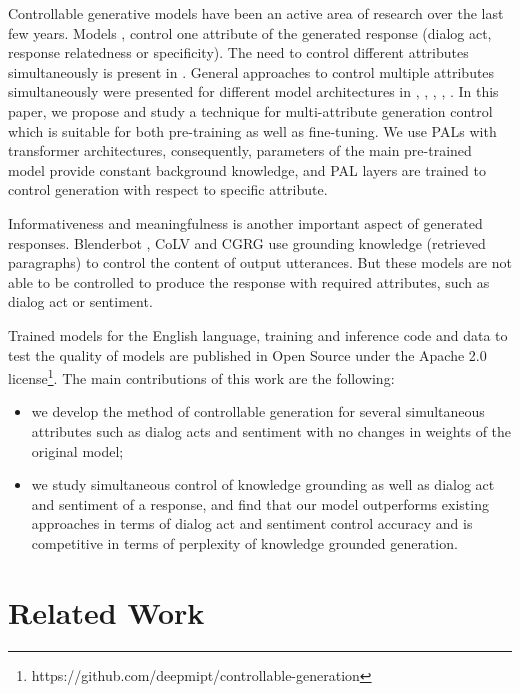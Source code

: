 \documentclass[11pt]{article}
\begin{document}
Controllable generative models have been an active area of research over the last few years. Models \cite{zhao2017learning}, \cite{zhang2018learning} control one attribute of the generated response (dialog act, response relatedness or specificity). The need to control different attributes simultaneously is present in \cite{see2019makes}. General approaches to control multiple attributes simultaneously were presented for different model architectures in \cite{hu2021controllable}, \cite{neural_meta_words}, \cite{attr_alignment}, \cite{side_control}, \cite{phed}. In this paper, we propose and study a technique for multi-attribute generation control which is suitable for both pre-training as well as fine-tuning. We use PALs \cite{stickland2019bert} with transformer architectures, consequently, parameters of the main pre-trained model provide constant background knowledge, and PAL layers are trained to control generation with respect to specific attribute.

Informativeness and meaningfulness is another important aspect of generated responses. Blenderbot \cite{roller2020recipes}, CoLV \cite{zhan2021colv} and CGRG \cite{wu2021controllable} use grounding knowledge (retrieved paragraphs) to control the content of output utterances. But these models are not able to be controlled to produce the response with required attributes, such as dialog act or sentiment.

Trained models for the English language, training and inference code and data to test the quality of models are published in Open Source under the Apache 2.0 license\footnote{https://github.com/deepmipt/controllable-generation}. The main contributions of this work are the following:
\begin{itemize}
    \item we develop the method of controllable generation for several simultaneous attributes such as dialog acts and sentiment with no changes in weights of the original model;
    \item we study simultaneous control of knowledge grounding as well as dialog act and sentiment of a response, and find that our model outperforms existing approaches in terms of dialog act and sentiment control accuracy and is competitive in terms of perplexity of knowledge grounded generation.
\end{itemize}

\section{Related Work}
\end{document}
